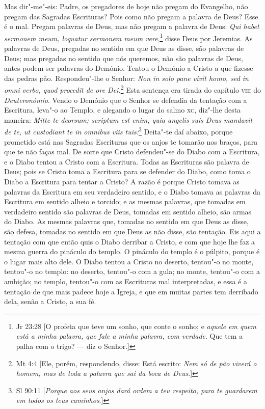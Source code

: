 Mas dir"-me"-eis: Padre, os pregadores de hoje não pregam do Evangelho,
não pregam das Sagradas Escrituras? Pois como não
pregam a palavra de Deus? Esse é o mal. Pregam palavras de Deus, mas
não pregam a palavra de Deus: \emph{Qui habet sermonem meum, loquatur
sermonem meum vere},\footnote{Jr 23:28 [O profeta que teve um sonho, que conte o sonho; e \emph{aquele em quem está a minha palavra, que fale a minha palavra, com verdade}. Que tem a palha com o trigo? --- diz o Senhor.]} disse Deus por Jeremias. As palavras de Deus,
pregadas no sentido em que Deus as disse, são palavras de Deus; mas
pregadas no sentido que nós queremos, não são palavras de Deus, antes
podem ser palavras do Demónio. Tentou o Demónio a Cristo a que fizesse
das pedras pão. Respondeu"-lhe o Senhor: \emph{Non in solo pane vivit
homo, sed in omni verbo, quod procedit de ore Dei.}\footnote{Mt 4:4 [Ele, porém, respondendo, disse: Está escrito: \emph{Nem só de pão viverá o homem, mas de toda
a palavra que sai da boca de Deus}.]} Esta sentença era
tirada do capítulo \textsc{viii} do \emph{Deuteronómio}. Vendo o Demónio que o
Senhor se defendia da tentação com a Escritura, leva"-o ao Templo, e
alegando o lugar do salmo \textsc{xc}, diz"-lhe desta maneira: \emph{Mitte te
deorsum; scriptum est enim, quia angelis suis Deus mandavit de te, ut
custodiant te in omnibus viis tuis:}\footnote{Sl 90:11 [\emph{Porque aos seus anjos dará ordem a teu respeito, para te guardarem em todos os teus caminhos}.]} Deita"-te daí abaixo, porque prometido está nas Sagradas Escrituras que os anjos te tomarão nos
braços, para que te não faças mal. De sorte que Cristo defendeu"-se do
Diabo com a Escritura, e o Diabo tentou a Cristo com a Escritura. Todas
as Escrituras são palavra de Deus; pois se Cristo toma a Escritura para
se defender do Diabo, como toma o Diabo a Escritura para tentar a
Cristo? A razão é porque Cristo tomava as palavras da Escritura em
seu verdadeiro sentido, e o Diabo tomava as palavras da Escritura em
sentido alheio e torcido; e as mesmas palavras, que tomadas em
verdadeiro sentido são palavras de Deus, tomadas em sentido alheio,
são armas do Diabo. As mesmas palavras que, tomadas no sentido em que
Deus as disse, são defesa, tomadas no sentido em que Deus as não disse,
são tentação. Eis aqui a tentação com que então quis o Diabo derribar a
Cristo, e com que hoje lhe faz a mesma guerra do pináculo do templo. O
pináculo do templo é o púlpito, porque é o lugar mais alto dele. O Diabo
tentou a Cristo no deserto, tentou"-o no monte, tentou"-o no templo: no
deserto, tentou"-o com a gula; no monte, tentou"-o com a ambição; no
templo, tentou"-o com as Escrituras mal interpretadas, e essa é a
tentação de que mais padece hoje a Igreja, e que em muitas partes tem
derribado dela, senão a Cristo, a sua fé.

